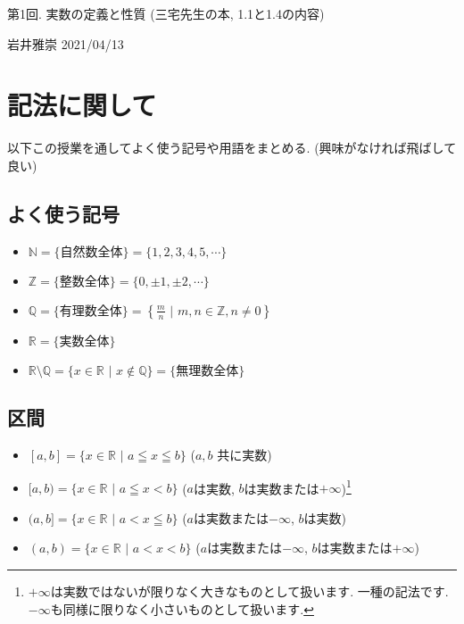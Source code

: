 \documentclass[dvipdfmx,a4paper,11pt]{article}
\newcommand{\R}{\mathbb{R}}
\newcommand{\Z}{\mathbb{Z}}
\newcommand{\Q}{\mathbb{Q}}
\newcommand{\N}{\mathbb{N}}
\theoremstyle{definition}
\begin{document}
\begin{center}
{\Large 第1回. 実数の定義と性質 (三宅先生の本, 1.1と1.4の内容)}
\end{center}

\begin{flushright}
 岩井雅崇 2021/04/13
\end{flushright}

\section{記法に関して}
以下この授業を通してよく使う記号や用語をまとめる.
(興味がなければ飛ばして良い)

\subsection{よく使う記号}
\begin{itemize}
\item $\N =\{ \text{自然数全体}\} = \{ 1,2,3,4,5,\cdots\}$
\item $\Z =\{ \text{整数全体}\} = \{ 0, \pm1, \pm 2,\cdots\}$
\item $\Q =\{ \text{有理数全体} \} = \left\{ \frac{m}{n} \,\,|\,\,  m,n \in \Z , n \neq 0 \right\}$
\item $\R =\{ \text{実数全体}\} $
\item $\R \setminus \Q=\{ x \in \R \,\, | \,\, x \not \in \Q\} = \{ \text{無理数全体}\} $
\end{itemize}

\subsection{区間}
\begin{itemize}
\item $ [a,b] = \{ x \in \R \,\,| \,\, a \leqq x \leqq b\}$ ($a,b$ 共に実数)
\item $ [a,b) = \{ x \in \R \,\,| \,\, a \leqq x < b\}$ ($a$は実数, $b$は実数または$+\infty$)\footnote{$+ \infty$は実数ではないが限りなく大きなものとして扱います. 一種の記法です. $- \infty$も同様に限りなく小さいものとして扱います.}
\item $ (a,b] = \{ x \in \R \,\,| \,\, a < x \leqq b\}$ ($a$は実数または$-\infty$, $b$は実数)
\item $ (a,b) = \{ x \in \R \,\,| \,\, a < x < b\}$ ($a$は実数または$-\infty$, $b$は実数または$+\infty$)
\end{itemize}
\end{document}
